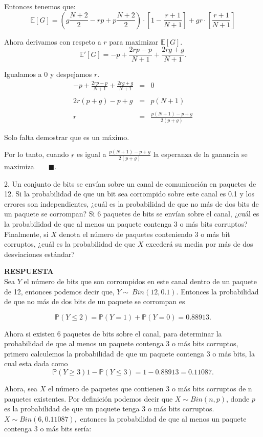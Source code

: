 \documentclass[11pt,letterpaper]{article}
\newcommand{\mP}{\mathbb{P}}
\newcommand{\mE}{\mathbb{E}}
\newcommand{\res}{\textbf{RESPUESTA}\\}
\newcommand{\fin}{$\blacksquare.$}
\begin{document}
\begin{itemize}
Entonces tenemos que:
$$\mE[G]= \left( g\frac{N+2}{2}-rp+p\frac{N+2}{2}\right)\cdot\left[1- \frac{r+1}{N+1} \right] +gr \cdot\left[ \frac{r+1}{N+1}\right]$$

Ahora derivamos con respeto a $r$ para maximizar $\mE [G]$. 
$$\mE'[G]= -p + \frac{2rp-p}{N+1}+\frac{2rg+g}{N+1}.$$

Igualamos a 0 y despejamos $r$.
\begin{equation*}
\begin{array}{ccl}
-p + \frac{2rp-p}{N+1}+\frac{2rg+g}{N+1}&=&0\\
&&\\
2r(p+g)-p+g&=&p(N+1)\\
&&\\
r&=&\frac{p(N+1)-p+g}{2(p+g)}
\end{array}
\end{equation*}

Solo falta demostrar que es un máximo. 

Por lo tanto, cuando $r$ es igual a $\frac{p(N+1)-p+g}{2(p+g)}$ la esperanza de la ganancia se maximiza\ \ \ \ \fin 

2. Un conjunto de bits se envían sobre un canal de comunicación en paquetes de 12. Si la probabilidad de que un bit sea corrompido sobre este canal es 0.1 y los errores son independientes,
¿cuál es la probabilidad de que no más de dos bits de un paquete se corrompan? Si 6 paquetes
de bits se envían sobre el canal, ¿cuál es la probabilidad de que al menos un paquete contenga 3 o más bits corruptos? Finalmente, si $X$ denota el número de paquetes conteniendo 3 o más bit corruptos, ¿cuál es la probabilidad de que $X$ excederá su media por más de dos desviaciones estándar? 

\res

Sea $Y$ el número de bits que son corrompidos en este canal dentro de un paquete de 12, entonces podemos decir que, $Y\sim \ Bin(12,0.1)$. Entonces la probabilidad de que no más de dos bits de un paquete se corrompan es

$$\mP(Y\leq2)= \mP(Y=1)+\mP(Y=0)=0.88913.$$

Ahora si existen 6 paquetes de bits sobre el canal, para determinar la probabilidad de que al menos un paquete contenga 3 o más bits corruptos, primero calculemos la probabilidad de que un paquete contenga 3 o más bits, la cual esta dada como 
$$\mP(Y\geq3) 1-\mP(Y\leq3)=1-0.88913= 0.11087.$$


Ahora, sea $X$ el número de paquetes que contienen 3 o más bits corruptos de n paquetes existentes. Por definición podemos decir que $X\sim Bin(n,p)$, donde $p$ es la probabilidad de que un paquete tenga 3 o más bits corruptos. $X\sim Bin(6,0.11087),$ entonces la probabilidad de que al menos un paquete contenga 3 o más bits sería:


\end{itemize}
\end{document}
